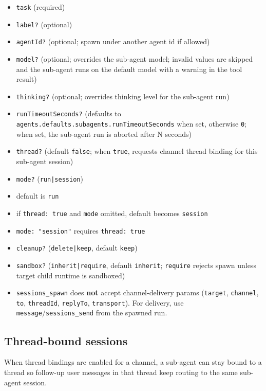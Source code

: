 \begin{itemize}
  \item \texttt{task} (required)
  \item \texttt{label?} (optional)
  \item \texttt{agentId?} (optional; spawn under another agent id if allowed)
  \item \texttt{model?} (optional; overrides the sub-agent model; invalid values are skipped and the sub-agent runs on the default model with a warning in the tool result)
  \item \texttt{thinking?} (optional; overrides thinking level for the sub-agent run)
  \item \texttt{runTimeoutSeconds?} (defaults to \texttt{agents.defaults.subagents.runTimeoutSeconds} when set, otherwise \texttt{0}; when set, the sub-agent run is aborted after N seconds)
  \item \texttt{thread?} (default \texttt{false}; when \texttt{true}, requests channel thread binding for this sub-agent session)
  \item \texttt{mode?} (\texttt{run|session})
  \item default is \texttt{run}
  \item if \texttt{thread: true} and \texttt{mode} omitted, default becomes \texttt{session}
  \item \texttt{mode: "session"} requires \texttt{thread: true}
  \item \texttt{cleanup?} (\texttt{delete|keep}, default \texttt{keep})
  \item \texttt{sandbox?} (\texttt{inherit|require}, default \texttt{inherit}; \texttt{require} rejects spawn unless target child runtime is sandboxed)
  \item \texttt{sessions\_spawn} does \textbf{not} accept channel-delivery params (\texttt{target}, \texttt{channel}, \texttt{to}, \texttt{threadId}, \texttt{replyTo}, \texttt{transport}). For delivery, use \texttt{message}/\texttt{sessions\_send} from the spawned run.
\end{itemize}


\subsection{Thread-bound sessions}


When thread bindings are enabled for a channel, a sub-agent can stay bound to a thread so follow-up user messages in that thread keep routing to the same sub-agent session.

